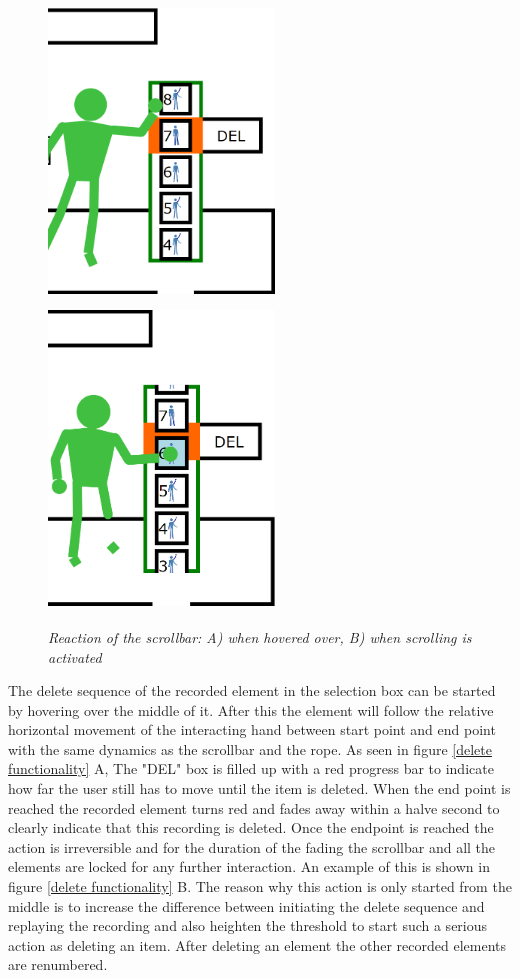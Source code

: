 \begin{figure}[H]
	\begin{center}
		\includegraphics[width=6cm, height=8cm]{figures/9_hover_scrollbar.png}
		\includegraphics[width=6cm, height=8cm]{figures/10_scroll_scrollbar.png}
		\caption{\emph{Reaction of the scrollbar: A) when hovered over, B) when scrolling is activated}}
		\label{scroll functionality}
	\end{center}
\end{figure}

The delete sequence of the recorded element in the selection box can be started by hovering over the middle of it. After this the element will follow the relative horizontal movement of the interacting hand between start point and end point with the same dynamics as the scrollbar and the rope. As seen in figure \ref{delete functionality} A, The "DEL" box is filled up with a red progress bar to indicate how far the user still has to move until the item is deleted. When the end point is reached the recorded element turns red and fades away within a halve second to clearly indicate that this recording is deleted. Once the endpoint is reached the action is irreversible and for the duration of the fading the scrollbar and all the elements are locked for any further interaction. An example of this is shown in figure \ref{delete functionality} B. The reason why this action is only started from the middle is to increase the difference between initiating the delete sequence and replaying the recording and also heighten the threshold to start such a serious action as deleting an item. After deleting an element the other recorded elements are renumbered.

